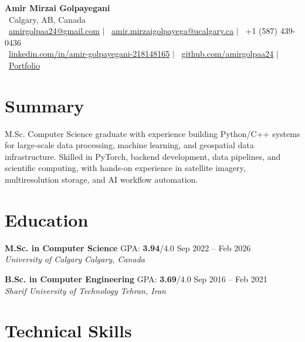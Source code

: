 \documentclass[a4paper,10pt]{article}
\newcommand{\resumeEducationSubheading}[5]{
    \textbf{#1} \hfill #2 \hfill #3 \\
    \textit{#4} \hfill \textit{#5}
}
\begin{document}

\begin{center}
    {\LARGE \textbf{Amir Mirzai Golpayegani}} \\[0.25em]
    \faMapMarker*~Calgary, AB, Canada \\[0.25em]
    \faEnvelope~\href{mailto:amirgolpaa24@gmail.com}{amirgolpaa24@gmail.com}
    $|$
    \faEnvelope~\href{mailto:amir.mirzaigolpayega@ucalgary.ca}{amir.mirzaigolpayega@ucalgary.ca}
    $|$
    \faPhone*~+1 (587) 439-0436 \\[0.25em]
    \faLinkedin~\href{https://linkedin.com/in/amir-golpayegani-218148165}{linkedin.com/in/amir-golpayegani-218148165}
    $|$
    \faGithub~\href{https://github.com/amirgolpaa24}{github.com/amirgolpaa24}
    $|$
    \faGlobe~\href{https://amir-portfolio-navy.vercel.app/}{Portfolio}
\end{center}


\section*{Summary}

M.Sc. Computer Science graduate with experience building Python/C++ systems for large-scale data processing, machine learning, and geospatial data infrastructure. Skilled in PyTorch, backend development, data pipelines, and scientific computing, with hands-on experience in satellite imagery, multiresolution storage, and AI workflow automation.


\section*{Education}

\resumeEducationSubheading
{M.Sc. in Computer Science}
{GPA: \textbf{3.94}/4.0}
{Sep 2022 -- Feb 2026}
{University of Calgary}
{Calgary, Canada}

\vspace{0.35em}

\resumeEducationSubheading
{B.Sc. in Computer Engineering}
{GPA: \textbf{3.69}/4.0}
{Sep 2016 -- Feb 2021}
{Sharif University of Technology}
{Tehran, Iran}


\section*{Technical Skills}
\end{document}
